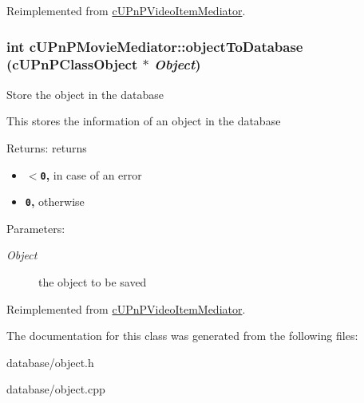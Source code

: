Reimplemented from \hyperlink{classcUPnPVideoItemMediator_dd8927340a69d247965ef9250adefb21}{cUPnPVideoItemMediator}.\hypertarget{classcUPnPMovieMediator_61ab6dcaf2417898428ddf1f635788b7}{
\subsubsection[{objectToDatabase}]{\setlength{\rightskip}{0pt plus 5cm}int cUPnPMovieMediator::objectToDatabase ({\bf cUPnPClassObject} $\ast$ {\em Object})}}
\label{classcUPnPMovieMediator_61ab6dcaf2417898428ddf1f635788b7}


Store the object in the database

This stores the information of an object in the database

\begin{Desc}
\item[Returns:]returns\begin{itemize}
\item {\bf {\tt $<$0},} in case of an error\item {\bf {\tt 0},} otherwise \end{itemize}
\end{Desc}
\begin{Desc}
\item[Parameters:]
\begin{description}
\item[{\em Object}]the object to be saved \end{description}
\end{Desc}
 

Reimplemented from \hyperlink{classcUPnPVideoItemMediator_984e10738bca46ce38307d5f60e26bd3}{cUPnPVideoItemMediator}.

The documentation for this class was generated from the following files:\begin{CompactItemize}
\item 
database/object.h\item 
database/object.cpp\end{CompactItemize}
